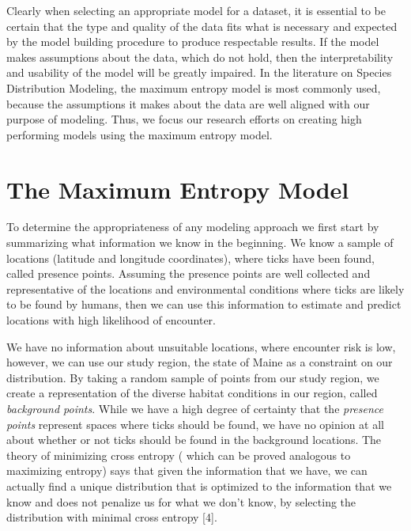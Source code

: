 \noindent Clearly when selecting an appropriate model for a dataset, it is essential to be certain that the type and quality of the data fits what is necessary and expected by the model building procedure to produce respectable results. If the model makes assumptions about the data, which do not hold, then the interpretability and usability of the model will be greatly impaired. In the literature on Species Distribution Modeling, the maximum entropy model is most commonly used, because the assumptions it makes about the data are well aligned with our purpose of modeling. Thus, we focus our research efforts on creating high performing models using the maximum entropy model. \newline


\section{The Maximum Entropy Model}

To determine the appropriateness of any modeling approach we first start by summarizing what information we know in the beginning. We know a sample of locations (latitude and longitude coordinates), where ticks have been found, called presence points. Assuming the presence points are well collected and representative of the locations and environmental conditions where ticks are likely to be found by humans, then we can use this information to estimate and predict locations with high likelihood of encounter. \newline

\noindent We have no information about unsuitable locations, where encounter risk is low, however, we can use our study region, the state of Maine as a constraint on our distribution. By taking a random sample of points from our study region, we create a representation of the diverse habitat conditions in our region, called \textit{background points}. While we have a high degree of certainty that the \textit{presence points} represent spaces where ticks should be found, we have no opinion at all about whether or not ticks should be found in the background locations. The theory of minimizing cross entropy ( which can be proved analogous to maximizing entropy)  says that given the information that we have, we can actually find a unique distribution that is optimized to the information that we know and does not penalize us for what we don't know, by selecting the distribution with minimal cross entropy [4].\newline


